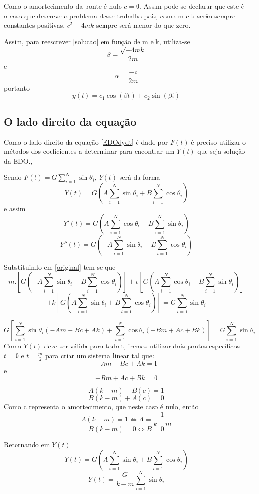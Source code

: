 \documentclass[12pt]{article}
\begin{document}
Como o amortecimento da ponte é nulo $c=0$. Assim pode se declarar que este 
é o caso que descreve o problema desse trabalho pois, como m e k serão sempre constantes positivas, 
$c^2 -4mk$ sempre será menor do que zero.

Assim, para reescrever \ref{solucao} em função de m e k, utiliza-se 
\[ \beta = \frac{\sqrt{-4mk}}{2m}\] 
e \[ \alpha = \frac{-c}{2m}\] 
portanto
\begin{equation}
    y(t) = c_1\cos(\beta t) + c_2 \sin(\beta t)
    \label{fundamental}
\end{equation}

\subsection{O lado direito da equação}

Como o lado direito da equação \ref{EDOdydt} é dado por $F(t)$ é preciso utilizar o 
métodos dos coeficientes a determinar para encontrar um $Y(t)$ que seja solução da EDO.,

Sendo $F(t) = G\sum_{i = 1}^{N}  \sin \theta_i$, $Y(t)$ será da forma
\[Y(t) = G(A\sum_{i = 1}^{N}  \sin \theta_i + B\sum_{i = 1}^{N}  \cos \theta_i )\] 
e assim
\[Y'(t) = G(A\sum_{i = 1}^{N}  \cos \theta_i - B\sum_{i = 1}^{N}  \sin \theta_i )\] 
\[Y''(t) = G(-A\sum_{i = 1}^{N}  \sin \theta_i - B\sum_{i = 1}^{N}  \cos \theta_i )\] 

Substituindo em \ref{original} tem-se que
    $$m.[G(-A\sum_{i = 1}^{N}  \sin \theta_i - B\sum_{i = 1}^{N}  \cos \theta_i )] + c[G(A\sum_{i = 1}^{N}  \cos \theta_i - B\sum_{i = 1}^{N}  \sin \theta_i )] $$
    $$+ k[G(A\sum_{i = 1}^{N}  \sin \theta_i + B\sum_{i = 1}^{N}  \cos \theta_i )] = G\sum_{i = 1}^{N}  \sin \theta_i $$

\[G[\sum_{i = 1}^{N}  \sin \theta_i(-Am - Bc + Ak) + \sum_{i = 1}^{N}  \cos \theta_i(-Bm +Ac + Bk)] = G\sum_{i = 1}^{N}  \sin \theta_i\]
Como $Y(t)$ deve ser válida para todo t, iremos utilizar dois pontos específicos $t=0$ e $t= \frac{pi}{2}$
para criar um sistema linear tal que:
\[ -Am - Bc + Ak = 1 \] 
e 
\[ -Bm + Ac + Bk = 0 \] 

\[ A(k - m) - B(c) = 1\] 
\[ B(k - m) + A(c) = 0\]
Como c representa o amortecimento, que neste caso é nulo, então
\[ A(k - m) = 1  \Leftrightarrow A = \frac{1}{k -m}\] 
\[ B(k - m) = 0 \Leftrightarrow B = 0\]

Retornando em $Y(t)$
\[Y(t) = G(A\sum_{i = 1}^{N}  \sin \theta_i + B\sum_{i = 1}^{N}  \cos \theta_i )\] 
\[Y(t) = \frac{G}{k -m}\sum_{i = 1}^{N}  \sin \theta_i\] 
\end{document}
